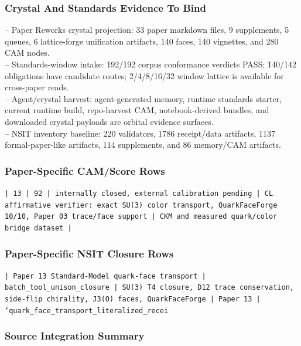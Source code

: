 \documentclass[11pt]{article}
\begin{document}
\subsubsection*{Crystal And Standards Evidence To Bind}

\noindent{}-- Paper Reworks crystal projection: 33 paper markdown files, 9 supplements, 5 queues, 6 lattice-forge unification artifacts, 140 faces, 140 vignettes, and 280 CAM nodes.\\
\noindent{}-- Standards-window intake: 192/192 corpus conformance verdicts PASS; 140/142 obligations have candidate routes; 2/4/8/16/32 window lattice is available for cross-paper reads.\\
\noindent{}-- Agent/crystal harvest: agent-generated memory, runtime standards starter, current runtime build, repo-harvest CAM, notebook-derived bundles, and downloaded crystal payloads are orbital evidence surfaces.\\
\noindent{}-- NSIT inventory baseline: 220 validators, 1786 receipt/data artifacts, 1137 formal-paper-like artifacts, 114 supplements, and 86 memory/CAM artifacts.\\

\subsubsection*{Paper-Specific CAM/Score Rows}

\noindent\texttt{| 13 | 92 | internally closed, external calibration pending | CL affirmative verifier: exact SU(3) color transport, QuarkFaceForge 10/10, Paper 03 trace/face support | CKM and measured quark/color bridge dataset |}\\

\subsubsection*{Paper-Specific NSIT Closure Rows}

\noindent\texttt{| Paper 13 Standard-Model quark-face transport | batch\_tool\_unison\_closure | SU(3) T4 closure, D12 trace conservation, side-flip chirality, J3(O) faces, QuarkFaceForge | Paper 13 | `quark\_face\_transport\_literalized\_recei}\\

\subsubsection*{Source Integration Summary}
\end{document}
